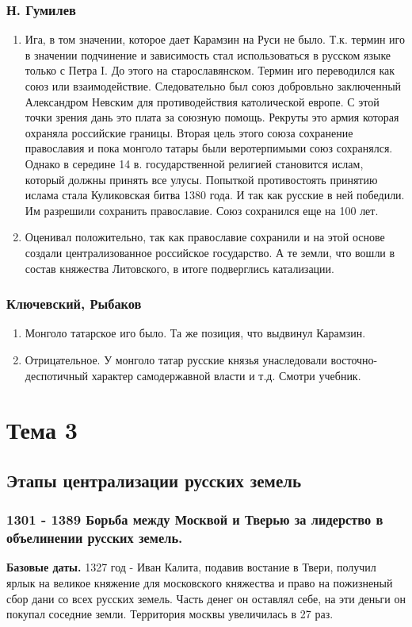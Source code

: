 \documentclass[a4paper]{article}
\begin{document}
\subsubsection{Н. Гумилев}
\begin{enumerate}
    \item Ига, в том значении, которое дает Карамзин на Руси не было. Т.к. термин иго в значении подчинение и зависимость стал использоваться в русском языке только с Петра I. До этого на старославянском. Термин иго переводился как союз или взаимодействие. Следовательно был союз добровльно заключенный Александром Невским для противодействия католической европе.
    С этой точки зрения дань это плата за союзную помощь. Рекруты это армия которая охраняла российские границы. Вторая цель этого союза сохранение православия и пока монголо татары были веротерпимыми союз сохранялся. Однако в середине 14 в. государственной религией становится ислам, который должны принять все улусы. Попыткой противостоять принятию ислама стала Куликовская битва 1380 года. И так как русские в ней победили. Им разрешили сохранить православие. Союз сохранился еще на 100 лет.
    \item Оценивал положительно, так как православие сохранили и на этой основе создали централизованное российское государство. А те земли, что вошли в состав княжества Литовского, в итоге подверглись катализации.
\end{enumerate}

\subsubsection{Ключевский, Рыбаков} 
\begin{enumerate}
    \item Монголо татарское иго было. Та же позиция, что выдвинул Карамзин.
    \item Отрицательное. У монголо татар русские князья унаследовали восточно-деспотичный характер самодержавной власти и т.д. Смотри учебник.
\end{enumerate}

\section{Тема 3}
\subsection{Этапы централизации русских земель}
\subsubsection{1301 - 1389 Борьба между Москвой и Тверью за лидерство в объелинении русских земель.}
\textbf{Базовые даты.}
1327 год - Иван Калита, подавив востание в Твери, получил ярлык на великое княжение для московского княжества и право на пожизненый сбор дани со всех русских земель. Часть денег он оставлял себе, на эти деньги он покупал соседние земли.
Территория москвы увеличилась в 27 раз.
\end{document}
